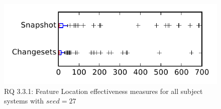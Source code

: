 
\begin{figure}
\centering
\includegraphics[height=0.4\textheight]{figures/flt_seed/rq1_tiny_27}
\caption{RQ 3.3.1: Feature Location effectiveness measures for all subject systems with $seed=27$}
\label{fig:flt_seed:rq1:tiny}
\end{figure}
